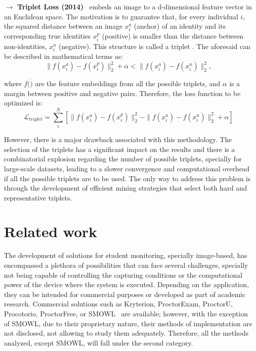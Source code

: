 \documentclass[class=report, crop=false, a4paper, 12pt]{standalone}
\begin{document}
\vspace{0.7\baselineskip}
\noindent\textbf{$\rightarrow$ Triplet Loss (2014)}~\autocite{schroffFaceNetUnifiedEmbedding2015} embeds an image to a d-dimensional feature vector in an Euclidean space. The motivation is to guarantee that, for every individual $i$, the squared distance between an image $x^{a}_{i}$ (anchor) of an identity and its corresponding true identities $x^{p}_{i}$ (positive) is smaller than the distance between non-identities, $x^{n}_{i}$ (negative). This structure is called a triplet . The aforesaid can be described in mathematical terms as:
\begin{equation}
\|f(x^{a}_{i})-f(x^{p}_{i})\|^{2}_{2} + \alpha < \|f(x^{a}_{i})-f(x^{n}_{i})\|^{2}_{2},
\end{equation}

\noindent where $f(\dot)$ are the feature embeddings from all the possible triplets, and $\alpha$ is a margin between positive and negative pairs. Therefore, the loss function to be optimized is:
\begin{equation}
\mathcal{L}_{triplet} = \sum_{i}^{N}\left[\|f(x^{a}_{i})-f(x^{p}_{i})\|^{2}_{2}-\|f(x^{a}_{i})-f(x^{n}_{i})\|^{2}_{2}+\alpha\right]
\end{equation}

\par However, there is a major drawback associated with this methodology. The selection of the triplets has a significant impact on the results and there is a combinatorial explosion regarding the number of possible triplets, specially for large-scale datasets, leading to a slower convergence and computational overhead if all the possible triplets are to be used. The only way to address this problem is through the development of efficient mining strategies that select both hard and representative triplets.

\section{Related work}
\label{sec:related_work}
The development of solutions for student monitoring, specially image-based, has encompassed a plethora of possibilities that can face several challenges, specially not being capable of controlling the capturing conditions or the computational power of the device where the system is executed. Depending on the application, they can be intended for commercial purposes or developed as part of academic research. Commercial solutions such as Kryterion, ProctorExam, ProctorU, Procotorio, ProctorFree, or SMOWL~\autocite{portugalContinuousUserIdentification2023} are available; however, with the exception of SMOWL, due to their proprietary nature, their methods of implementation are not disclosed, not allowing to study them adequately. Therefore, all the methods analyzed, except SMOWL, will fall under the second category.
\end{document}
